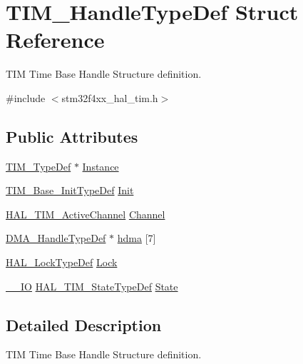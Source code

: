 \hypertarget{struct_t_i_m___handle_type_def}{}\section{T\+I\+M\+\_\+\+Handle\+Type\+Def Struct Reference}
\label{struct_t_i_m___handle_type_def}


T\+IM Time Base Handle Structure definition.  




{\ttfamily \#include $<$stm32f4xx\+\_\+hal\+\_\+tim.\+h$>$}

\subsection*{Public Attributes}
\begin{DoxyCompactItemize}
\item 
\hyperlink{struct_t_i_m___type_def}{T\+I\+M\+\_\+\+Type\+Def} $\ast$ \hyperlink{struct_t_i_m___handle_type_def_ad0c5f736a15f6d8d14724854c8133bcc}{Instance}
\item 
\hyperlink{struct_t_i_m___base___init_type_def}{T\+I\+M\+\_\+\+Base\+\_\+\+Init\+Type\+Def} \hyperlink{struct_t_i_m___handle_type_def_a8b2e61c3c4128e62cb7be7d35048152e}{Init}
\item 
\hyperlink{group___t_i_m___exported___types_gaa3fa7bcbb4707f1151ccfc90a8cf9706}{H\+A\+L\+\_\+\+T\+I\+M\+\_\+\+Active\+Channel} \hyperlink{struct_t_i_m___handle_type_def_ae9c5a11c1f5b27c808c0aca453e63870}{Channel}
\item 
\hyperlink{group___d_m_a___exported___types_ga41b754a906b86bce54dc79938970138b}{D\+M\+A\+\_\+\+Handle\+Type\+Def} $\ast$ \hyperlink{struct_t_i_m___handle_type_def_a15338c71de82fa178c685be868e694bd}{hdma} \mbox{[}7\mbox{]}
\item 
\hyperlink{stm32f4xx__hal__def_8h_ab367482e943333a1299294eadaad284b}{H\+A\+L\+\_\+\+Lock\+Type\+Def} \hyperlink{struct_t_i_m___handle_type_def_a2a24b963b57150ed2fb0f051cd87b65a}{Lock}
\item 
\hyperlink{core__sc300_8h_aec43007d9998a0a0e01faede4133d6be}{\+\_\+\+\_\+\+IO} \hyperlink{group___t_i_m___exported___types_gae0994cf5970e56ca4903e9151f40010c}{H\+A\+L\+\_\+\+T\+I\+M\+\_\+\+State\+Type\+Def} \hyperlink{struct_t_i_m___handle_type_def_a6b6eeaf94f2e6e3d0a5bdac44adf21d6}{State}
\end{DoxyCompactItemize}


\subsection{Detailed Description}
T\+IM Time Base Handle Structure definition. 

